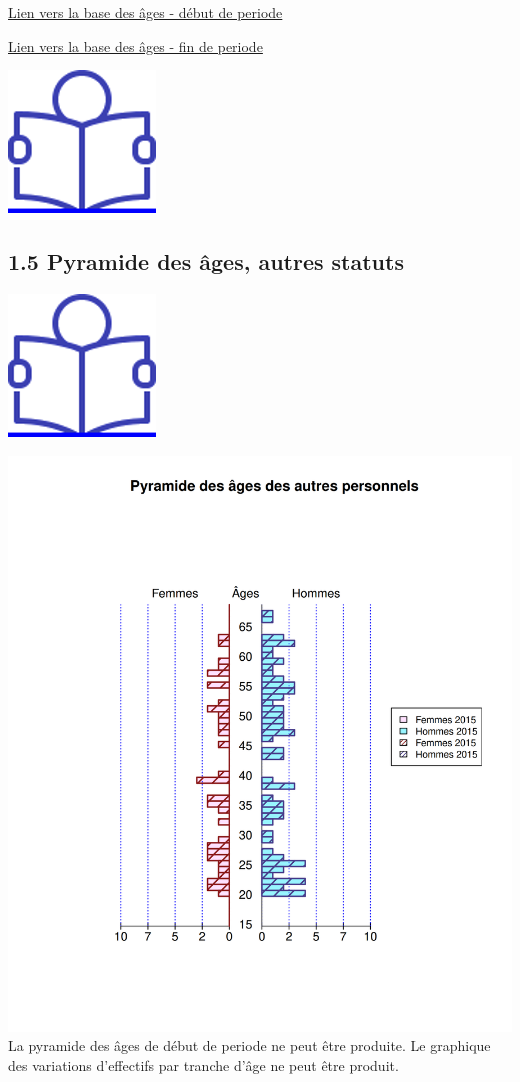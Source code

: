 \href{../Bases/Effectifs/Pyramide-des-ages-des-non-titulaires_2009.csv}{Lien
vers la base des âges - début de periode}

\href{../Bases/Effectifs/Pyramide-des-ages-des-non-titulaires_2013.csv}{Lien
vers la base des âges - fin de periode}

\href{../Docs/Notices/fiche_1.odt}{\includegraphics{icones/Notice.png}}

\hypertarget{pyramide-des-ages-autres-statuts}{%
\subsection{1.5 Pyramide des âges, autres statuts
~}\label{pyramide-des-ages-autres-statuts}}

\href{../Docs/Notices/fiche_2.odt}{\includegraphics{icones/Notice.png}}

\includegraphics{altair_files/figure-latex/unnamed-chunk-29-1.png} La
pyramide des âges de début de periode ne peut être produite. \newpage Le
graphique des variations d'effectifs par tranche d'âge ne peut être
produit.

